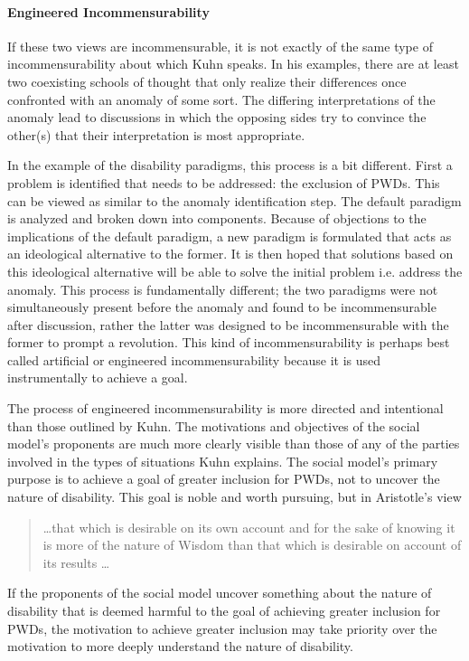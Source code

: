 \documentclass[a4paper]{article}
\begin{document}
\paragraph{Engineered Incommensurability}

If these two views are incommensurable, it is not exactly of the same type of
incommensurability about which Kuhn speaks. In his examples, there are at
least two coexisting schools of thought that only realize their differences
once confronted with an anomaly of some sort. The differing interpretations of
the anomaly lead to discussions in which the opposing sides try to convince
the other(s) that their interpretation is most appropriate.

In the example of the disability paradigms, this process is a bit different.
First a problem is identified that needs to be addressed: the exclusion of
PWDs. This can be viewed as similar to the anomaly identification step. The
default paradigm is analyzed and broken down into components. Because of
objections to the implications of the default paradigm, a new paradigm is
formulated that acts as an ideological alternative to the former. It is then
hoped that solutions based on this ideological alternative will be able to
solve the initial problem i.e. address the anomaly. This process is
fundamentally different; the two paradigms were not simultaneously present
before the anomaly and found to be incommensurable after discussion, rather
the latter was designed to be incommensurable with the former to prompt a
revolution. This kind of incommensurability is perhaps best called artificial
or engineered incommensurability because it is used instrumentally to achieve
a goal.

The process of engineered incommensurability is more directed and intentional
than those outlined by Kuhn. The motivations and objectives of the social
model's proponents are much more clearly visible than those of any of the
parties involved in the types of situations Kuhn explains. The social model's
primary purpose is to achieve a goal of greater inclusion for PWDs, not to
uncover the nature of disability. This goal is noble and worth pursuing, but
in Aristotle's view
%
\begin{quote}
    \ldots that which is desirable on its own account and for the sake of
    knowing it is more of the nature of Wisdom than that which is desirable on
    account of its results \ldots
\end{quote}
%
If the proponents of the social model uncover something about the nature of
disability that is deemed harmful to the goal of achieving greater inclusion
for PWDs, the motivation to achieve greater inclusion may take priority over
the motivation to more deeply understand the nature of disability.
\end{document}
